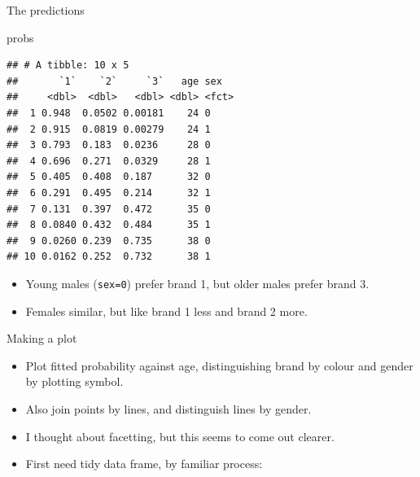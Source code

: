 \documentclass[ignorenonframetext,]{beamer}
\newenvironment{Shaded}{\begin{snugshade}}{\end{snugshade}}
\newcommand{\KeywordTok}[1]{\textcolor[rgb]{0.13,0.29,0.53}{\textbf{#1}}}
\newcommand{\NormalTok}[1]{#1}
\newcommand{\OperatorTok}[1]{\textcolor[rgb]{0.81,0.36,0.00}{\textbf{#1}}}
\newcommand{\StringTok}[1]{\textcolor[rgb]{0.31,0.60,0.02}{#1}}
\begin{document}
\begin{frame}[fragile]{The predictions}
\protect\hypertarget{the-predictions}{}

\small

\begin{Shaded}
\begin{Highlighting}[]
\NormalTok{probs}
\end{Highlighting}
\end{Shaded}

\begin{verbatim}
## # A tibble: 10 x 5
##       `1`    `2`     `3`   age sex  
##     <dbl>  <dbl>   <dbl> <dbl> <fct>
##  1 0.948  0.0502 0.00181    24 0    
##  2 0.915  0.0819 0.00279    24 1    
##  3 0.793  0.183  0.0236     28 0    
##  4 0.696  0.271  0.0329     28 1    
##  5 0.405  0.408  0.187      32 0    
##  6 0.291  0.495  0.214      32 1    
##  7 0.131  0.397  0.472      35 0    
##  8 0.0840 0.432  0.484      35 1    
##  9 0.0260 0.239  0.735      38 0    
## 10 0.0162 0.252  0.732      38 1
\end{verbatim}

\normalsize

\begin{itemize}
\item
  Young males (\texttt{sex=0}) prefer brand 1, but older males prefer
  brand 3.
\item
  Females similar, but like brand 1 less and brand 2 more.
\end{itemize}

\end{frame}

\begin{frame}[fragile]{Making a plot}
\protect\hypertarget{making-a-plot}{}

\begin{itemize}
\item
  Plot fitted probability against age, distinguishing brand by colour
  and gender by plotting symbol.
\item
  Also join points by lines, and distinguish lines by gender.
\item
  I thought about facetting, but this seems to come out clearer.
\item
  First need tidy data frame, by familiar process:
\end{itemize}

\begin{Shaded}
\end{Shaded}

\end{frame}
\end{document}
